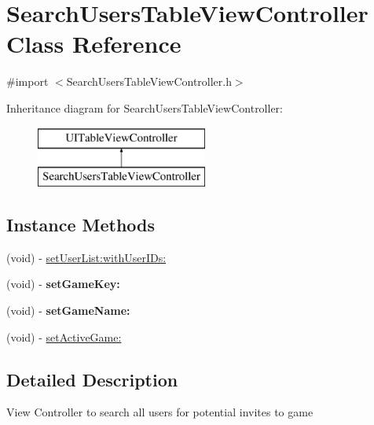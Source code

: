 \hypertarget{interface_search_users_table_view_controller}{\section{Search\+Users\+Table\+View\+Controller Class Reference}
\label{interface_search_users_table_view_controller}
}


{\ttfamily \#import $<$Search\+Users\+Table\+View\+Controller.\+h$>$}

Inheritance diagram for Search\+Users\+Table\+View\+Controller\+:\begin{figure}[H]
\begin{center}
\leavevmode
\includegraphics[height=2.000000cm]{interface_search_users_table_view_controller}
\end{center}
\end{figure}
\subsection*{Instance Methods}
\begin{DoxyCompactItemize}
\item 
(void) -\/ \hyperlink{interface_search_users_table_view_controller_a1b4e35102f4ca03e4e7b4aec2ebf434b}{set\+User\+List\+:with\+User\+I\+Ds\+:}
\item 
\hypertarget{interface_search_users_table_view_controller_af85a061bc1879ab1b14fa1456abcef72}{(void) -\/ {\bfseries set\+Game\+Key\+:}}\label{interface_search_users_table_view_controller_af85a061bc1879ab1b14fa1456abcef72}

\item 
\hypertarget{interface_search_users_table_view_controller_a1810d97565d73b18f230b6a636fab125}{(void) -\/ {\bfseries set\+Game\+Name\+:}}\label{interface_search_users_table_view_controller_a1810d97565d73b18f230b6a636fab125}

\item 
(void) -\/ \hyperlink{interface_search_users_table_view_controller_a68b4b3312cf7b98997e22fcba139ccd0}{set\+Active\+Game\+:}
\end{DoxyCompactItemize}


\subsection{Detailed Description}
View Controller to search all users for potential invites to game 

